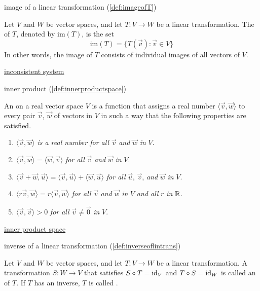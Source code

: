 \documentclass{ximera}
\begin{document}
image of a linear transformation (\ref{def:imageofT})
\begin{expandable}
    Let $V$ and $W$ be vector spaces, and let $T:V\rightarrow W$ be a linear transformation.  The  of $T$, denoted by $\mbox{im}(T)$, is the set
$$\mbox{im}(T)=\{T(\vec{v}):\vec{v}\in V\}$$
In other words, the image of $T$ consists of individual images of all vectors of $V$.
\end{expandable}

\href{https://ximera.osu.edu/oerlinalg/LinearAlgebra/SYS-0010/main}{inconsistent system}

inner product (\ref{def:innerproductspace})
\begin{expandable}
    An  on a real vector space $V$ is a function that assigns a real number $\langle\vec{v}, \vec{w}\rangle$ to every pair $\vec{v}$, $\vec{w}$ of vectors in $V$ in such a way that the following properties are satisfied.

\begin{enumerate}
\item  $\langle\vec{v}, \vec{w}\rangle$ \textit{is a real number for all} $\vec{v}$ \textit{and} $\vec{w}$ \textit{in} $V$.

\item  $\langle\vec{v}, \vec{w}\rangle = \langle\vec{w}, \vec{v}\rangle$ \textit{for all} $\vec{v}$ \textit{and} $\vec{w}$ \textit{in} $V$.

\item  $\langle\vec{v} + \vec{w}, \vec{u}\rangle = \langle\vec{v}, \vec{u}\rangle + \langle\vec{w}, \vec{u}\rangle$ \textit{for all} $\vec{u}$, $\vec{v}$, \textit{and} $\vec{w}$ \textit{in} $V$.

\item $\langle r\vec{v}, \vec{w}\rangle = r\langle\vec{v}, \vec{w}\rangle$ \textit{for all} $\vec{v}$ \textit{and} $\vec{w}$ \textit{in} $V$ \textit{and all} $r$ \textit{in} $\mathbb{R}$.

\item  $\langle\vec{v}, \vec{v}\rangle > 0$ \textit{for all} $\vec{v} \neq \vec{0}$ \textit{in} $V$.

\end{enumerate}
\end{expandable}

\href{https://ximera.osu.edu/oerlinalg/LinearAlgebra/VSP-0070/main}{inner product space}

inverse of a linear transformation (\ref{def:inverseoflintrans})
\begin{expandable}
    Let $V$ and $W$ be vector spaces, and let $T:V\rightarrow W$ be a linear transformation.  A transformation $S:W\rightarrow V$ that satisfies $S\circ T=\text{id}_V$ and $T\circ S=\text{id}_W$ is called an  of $T$. If $T$ has an inverse, $T$ is called .
\end{expandable}
\end{document}
